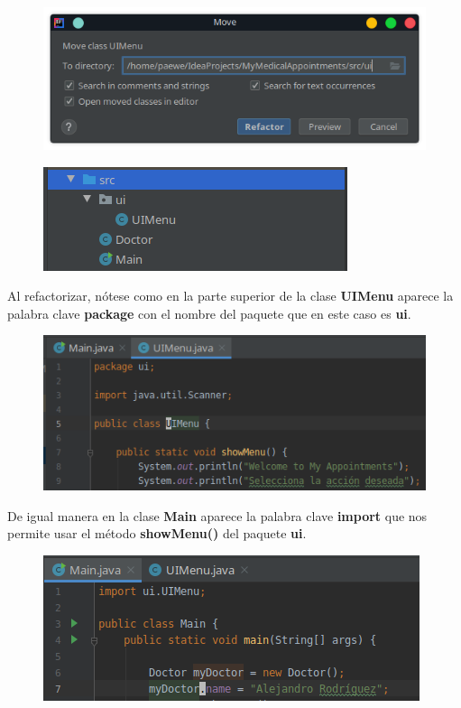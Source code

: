 \documentclass{article}
\begin{document}
\begin{figure}[h!]
  \centering
  \includegraphics[scale=0.75]{./Pictures/021_move_UIMenu.png}
\end{figure}

\begin{figure}[h!]
  \centering
  \includegraphics[scale=0.75]{./Pictures/022_package_ui.png}
\end{figure}

Al refactorizar, nótese como en la parte superior de la clase \textbf{UIMenu}
aparece la palabra clave \textbf{package} con el nombre del paquete que en este
caso es \textbf{ui}.\\

\begin{figure}[h!]
  \centering
  \includegraphics[scale=0.75]{./Pictures/023_package_ui.png}
\end{figure}

De igual manera en la clase \textbf{Main} aparece la palabra clave
\textbf{import} que nos permite usar el método \textbf{showMenu()} del paquete
\textbf{ui}.\\

\begin{figure}[h!]
  \centering
  \includegraphics[scale=0.75]{./Pictures/024_package_main.png}
\end{figure}
\end{document}
